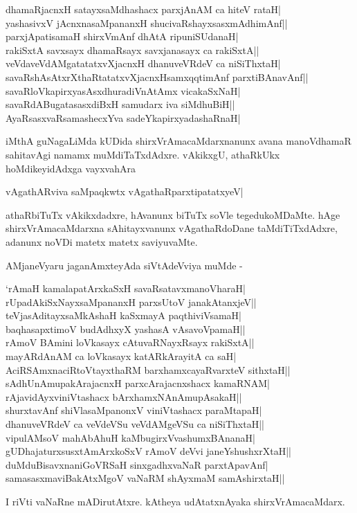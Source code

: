 \begin{shloka}
dhamaRjacnxH satayxsaMdhashacx parxjAnAM ca hiteV rataH|\label{223}\\
yashasivxV jAcnxnasaMpananxH shucivaRshayxsasxmAdhimAnf||\\
parxjApatisamaH shirxVmAnf dhAtA ripuniSUdanaH|\\
rakiSxtA savxsayx dhamaRsayx savxjanasayx ca rakiSxtA||\\
veVdaveVdAMgatatatxvXjacnxH dhanuveVRdeV ca niSiThxtaH|\\
savaRshAsAtxrXthaRtatatxvXjacnxHsamxqqtimAnf parxtiBAnavAnf||\\
savaRloVkapirxyasAsxdhuradiVnAtAmx vicakaSxNaH|\\
savaRdABugatasasxdiBxH samudarx iva siMdhuBiH||\\
AyaRsasxvaRsamashecxYva sadeYkapirxyadashaRnaH|
\end{shloka}

iMthA guNagaLiMda kUDida shirxVrAmacaMdarxnanunx avana manoVdhamaR sahitavAgi namamx muMdiTaTxdAdxre. vAkikxgU, athaRkUkx hoMdikeyidAdxga vayxvahAra 

\begin{shloka}
vAgathARviva saMpaqkwtx vAgathaRparxtipatatxyeV|\label{223a}
\end{shloka}
athaRbiTuTx vAkikxdadxre, hAvanunx biTuTx soVle tegedukoMDaMte. hAge shirxVrAmacaMdarxna sAhitayxvanunx vAgathaRdoDane taMdiTiTxdAdxre, adanunx noVDi matetx matetx saviyuvaMte.

AMjaneVyaru jaganAmxteyAda siVtAdeVviya muMde -

\begin{shloka}
`rAmaH kamalapatArxkaSxH savaRsatavxmanoVharaH|\\
rUpadAkiSxNayxsaMpananxH parxsUtoV janakAtanxjeV||\\
teVjasAditayxsaMkAshaH kaSxmayA paqthiviVsamaH|\\
baqhasapxtimoV budAdhxyX yashasA vAsavoVpamaH||\\
rAmoV BAmini loVkasayx cAtuvaRNayxRsayx rakiSxtA||\\
mayARdAnAM ca loVkasayx katARkArayitA ca saH|\\
AciRSAmxnaciRtoV\s tayxthaRM barxhamxcayaRvarxteV sithxtaH||\\
sAdhUnAmupakArajacnxH parxcArajacnxshacx kamaRNAM|\\
rAjavidAyxviniVtashacx bArxhamxNAnAmupAsakaH||\\
shurxtavAnf shiVlasaMpanonxV viniVtashacx paraMtapaH|\\
dhanuveVRdeV ca veVdeVSu veVdAMgeVSu ca niSiThxtaH||\\
vipulAMsoV mahAbAhuH kaMbugirxVvashumxBAnanaH|\\
gUDhajaturxsusxtAmArxkoSxV rAmoV deVvi janeYshushxrXtaH||\\
duMduBisavxnaniGoVRSaH sinxgadhxvaNaR parxtApavAnf|\\
samasasxmaviBakAtxMgoV vaNaRM shAyxmaM samAshirxtaH||
\end{shloka}
I riVti vaNaRne mADirutAtxre. kAtheya udAtatxnAyaka shirxVrAmacaMdarx.

